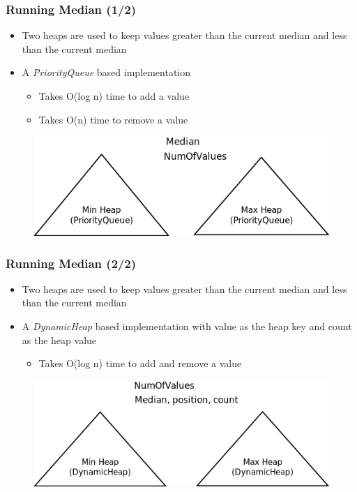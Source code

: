 \documentclass[handout]{beamer}
\begin{document}
\begin{frame}
\frametitle{Running Median (1/2)}

\begin{itemize}
        \item Two heaps are used to keep values greater than the current median and less than the current median
        \item A \textit{PriorityQueue} based implementation
		\begin{itemize}
        		\item Takes O(log n) time to add a value 
        		\item Takes O(n) time to remove a value
		\end{itemize}
\end{itemize}

\begin{figure}
        \includegraphics[width=0.6\linewidth]{runningmediang.png}
\end{figure}

\end{frame}


\begin{frame}
\frametitle{Running Median (2/2)}

\begin{itemize}
        \item Two heaps are used to keep values greater than the current median and less than the current median
        \item A \textit{DynamicHeap} based implementation with value as the heap key and count as the heap value 
                \begin{itemize}
                        \item Takes O(log n) time to add and remove a value
                \end{itemize}
\end{itemize}

\begin{figure}
        \includegraphics[width=0.6\linewidth]{runningmediand.png}
\end{figure}

\end{frame}
\end{document}
